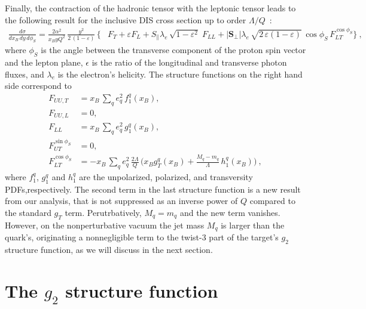 \documentclass[preprintnumbers,floatfix,nofootinbib]{revtex4}
\newcommand{\xbj}{{x_B}}                   %
\newcommand{\mj}{M_q}
\newcommand{\mq}{m_q}
\begin{document}
Finally, the contraction of the hadronic tensor with the leptonic tensor leads
to the following result for the inclusive DIS cross section up to order $\Lambda/Q$~\cite{Bacchetta:2006tn}:
\begin{align}
\frac{d\sigma}{d\xbj \, dy\, d\phi_S}
=
\frac{2 \alpha^2}{\xbj y Q^2}\,
\frac{y^2}{2\,(1-\varepsilon)}\, 
\biggl\{
&F_{T} + \varepsilon F_{L}
+ S_\parallel \lambda_e\,
  \sqrt{1-\varepsilon^2}\; 
F_{LL}
+ |\bm{S}_\perp| \lambda_e\, \sqrt{2\,\varepsilon (1-\varepsilon)}\, 
  \cos\phi_S\, 
F_{LT}^{\cos \phi_S}
 \biggr\} \ ,
\label{e:crossdis}
\end{align}
where $\phi_S$ is the angle between the transverse component of the proton spin vector and the lepton plane, $\epsilon$ is the ratio of the longitudinal and transverse photon fluxes, and $\lambda_e$ is the electron's helicity. 
The structure functions on the right hand side correspond to
\begin{align}
F_{UU ,T} &= \xbj\,\sum_q e_q^2\,f_1^q(\xbj),
\\
F_{UU ,L} &= 0,
\\
F_{LL} &=\xbj\,\sum_q e_q^2\,g_1^q(\xbj),
\\
F_{UT}^{\sin \phi_S}&=0,
\label{e:FUTint}
\\
F_{LT}^{\cos \phi_S}&=-\xbj\,\sum_q e_q^2\, \frac{2\Lambda}{Q}\,
\biggl(\xbj  g_T^q(\xbj)
   + \frac{\mj -\mq}{\Lambda} \, h_{1}^q(\xbj) \biggr) \ ,
\label{e:FLTint}
\end{align}
where $f_1^q$, $g_1^q$ and $h_1^q$ are the unpolarized, polarized, and transversity PDFs,respectively.
The second term in the last structure function is a new result from our
analysis, that is not suppressed as an inverse power of $Q$ compared to the
standard $g_T$ term. Perutrbatively, $M_q=m_q$ and the new term vanishes. However, on the nonperturbative vacuum the jet mass $M_q$ is larger than the quark's, originating a nonnegligible term to the twist-3 part of the target's $g_2$ structure function, as we will discuss in the next section.  

 

\section{The $g_2$ structure function}
\end{document}
